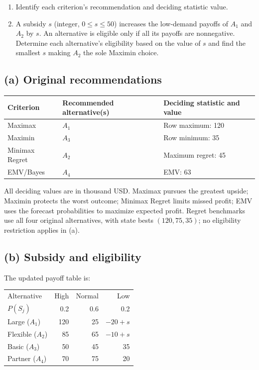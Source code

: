 \begin{enumerate}[label=\textbf{(\alph*)},leftmargin=*]
	\item Identify each criterion's recommendation and deciding statistic value. 

	\item A subsidy $s$ (integer, $0\leq s\leq50$) increases the low-demand payoffs of $A_1$ and $A_2$ by $s$. An alternative is eligible only if all its payoffs are nonnegative. Determine each alternative's eligibility based on the value of $s$ and find the smallest $s$ making $A_2$ the sole Maximin choice.
\end{enumerate}
\label{sol:q1a}
\subsection*{(a) Original recommendations }
\begin{center}
\begin{tabular}{lll}\toprule
Criterion & Recommended alternative(s) & Deciding statistic and value\\ \midrule
Maximax & $A_1$ & Row maximum: 120\\
Maximin & $A_3$ & Row minimum: 35\\
Minimax Regret & $A_2$ & Maximum regret: 45\\
EMV/Bayes & $A_4$ & EMV: 63\\
\bottomrule\end{tabular}
\end{center}
All deciding values are in thousand USD. Maximax pursues the greatest upside; Maximin protects the worst outcome; Minimax Regret limits missed profit; EMV uses the forecast probabilities to maximize expected profit. Regret benchmarks use all four original alternatives, with state bests $(120,75,35)$; no eligibility restriction applies in (a).
\secInicio[sec:q1]


\label{sol:q1b}
\subsection*{(b) Subsidy and eligibility }

The updated payoff table is:

\begin{center}\small\setlength{\tabcolsep}{4pt}
	\begin{tabular}{lrrr}\toprule
		Alternative & High & Normal & Low\\
		$P(S_j)$ & 0.2 & 0.6 & 0.2\\ \midrule
		Large ($A_1$) & 120 & 25 & $-20+s$\\
		Flexible ($A_2$) & 85 & 65 & $-10+s$\\
		Basic ($A_3$) & 50 & 45 & 35\\
		Partner ($A_4$) & 70 & 75 & 20\\
		\bottomrule
	\end{tabular}
\end{center}

